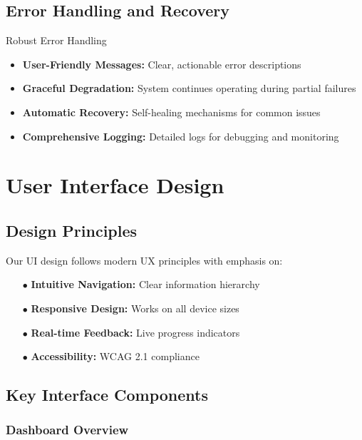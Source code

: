 \documentclass[12pt,a4paper]{report}
\begin{document}
\section{Error Handling and Recovery}

\begin{featurebox}{Robust Error Handling}
\begin{itemize}
    \item \textbf{User-Friendly Messages:} Clear, actionable error descriptions
    \item \textbf{Graceful Degradation:} System continues operating during partial failures
    \item \textbf{Automatic Recovery:} Self-healing mechanisms for common issues
    \item \textbf{Comprehensive Logging:} Detailed logs for debugging and monitoring
\end{itemize}
\end{featurebox}

\chapter{User Interface Design}

\section{Design Principles}

Our UI design follows modern UX principles with emphasis on:

\begin{itemize}[leftmargin=2cm]
    \item[\textcolor{primaryblue}{$\bullet$}] \textbf{Intuitive Navigation:} Clear information hierarchy
    \item[\textcolor{primaryblue}{$\bullet$}] \textbf{Responsive Design:} Works on all device sizes
    \item[\textcolor{primaryblue}{$\bullet$}] \textbf{Real-time Feedback:} Live progress indicators
    \item[\textcolor{primaryblue}{$\bullet$}] \textbf{Accessibility:} WCAG 2.1 compliance
\end{itemize}

\section{Key Interface Components}

\subsection{Dashboard Overview}
\end{document}
